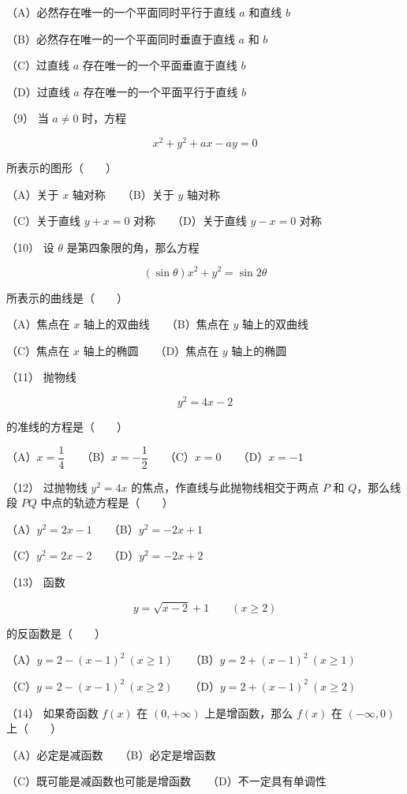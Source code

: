 \begin{question}
（A）必然存在唯一的一个平面同时平行于直线 $a$ 和直线 $b$

（B）必然存在唯一的一个平面同时垂直于直线 $a$ 和 $b$

（C）过直线 $a$ 存在唯一的一个平面垂直于直线 $b$

（D）过直线 $a$ 存在唯一的一个平面平行于直线 $b$

（9） 当 $a\ne0$ 时，方程

\nopagebreak[4]
\[
x^2+y^2+ax-ay=0
\]

所表示的图形\mbox{（　　）}

（A）关于 $x$ 轴对称　　（B）关于 $y$ 轴对称

（C）关于直线 $y+x=0$ 对称　　（D）关于直线 $y-x=0$ 对称

（10） 设 $\theta$ 是第四象限的角，那么方程

\nopagebreak[4]
\[
(\sin\theta)x^2+y^2=\sin2\theta
\]

所表示的曲线是\mbox{（　　）}

（A）焦点在 $x$ 轴上的双曲线　　（B）焦点在 $y$ 轴上的双曲线

（C）焦点在 $x$ 轴上的椭圆　　（D）焦点在 $y$ 轴上的椭圆

（11） 抛物线

\nopagebreak[4]
\[
y^2=4x-2
\]

的准线的方程是\mbox{（　　）}

（A）$x=\dfrac14$　　（B）$x=-\dfrac12$　　（C）$x=0$　　（D）$x=-1$

（12） 过抛物线 $y^2=4x$ 的焦点，作直线与此抛物线相交于两点 $P$ 和 $Q$，那么线段 $PQ$ 中点的轨迹方程是\mbox{（　　）}

（A）$y^2=2x-1$　　（B）$y^2=-2x+1$

（C）$y^2=2x-2$　　（D）$y^2=-2x+2$

（13） 函数

\nopagebreak[4]
\[
y=\sqrt{x-2}+1\qquad(x\ge2)
\]

的反函数是\mbox{（　　）}

（A）$y=2-(x-1)^2\ (x\ge1)$　　（B）$y=2+(x-1)^2\ (x\ge1)$

（C）$y=2-(x-1)^2\ (x\ge2)$　　（D）$y=2+(x-1)^2\ (x\ge2)$

（14） 如果奇函数 $f(x)$ 在 $(0,+\infty)$ 上是增函数，那么 $f(x)$ 在 $(-\infty,0)$ 上\mbox{（　　）}

（A）必定是减函数　　（B）必定是增函数

（C）既可能是减函数也可能是增函数　　（D）不一定具有单调性


\end{question}

